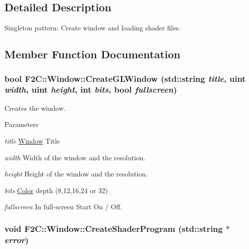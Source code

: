 \subsection{Detailed Description}
Singleton pattern: Create window and loading shader files. 

\subsection{Member Function Documentation}
\hypertarget{class_f2_c_1_1_window_aaf0f8a2b7bf33c732dc32ca862fc8dac}{
\subsubsection[{CreateGLWindow}]{\setlength{\rightskip}{0pt plus 5cm}bool F2C::Window::CreateGLWindow (std::string {\em title}, \/  {\bf uint} {\em width}, \/  {\bf uint} {\em height}, \/  int {\em bits}, \/  bool {\em fullscreen})}}
\label{class_f2_c_1_1_window_aaf0f8a2b7bf33c732dc32ca862fc8dac}


Creates the window. 
\begin{DoxyParams}{Parameters}
\item[{\em title}]\hyperlink{class_f2_c_1_1_window}{Window} Title \item[{\em width}]Width of the window and the resolution. \item[{\em height}]Height of the window and the resolution. \item[{\em bits}]\hyperlink{class_f2_c_1_1_color}{Color} depth (8,12,16,24 or 32) \item[{\em fullscreen}]In full-\/screen Start On / Off. \end{DoxyParams}
\hypertarget{class_f2_c_1_1_window_adad7a68be0de8516ae26ca4af18a2bdf}{
\subsubsection[{CreateShaderProgram}]{\setlength{\rightskip}{0pt plus 5cm}void F2C::Window::CreateShaderProgram (std::string $\ast$ {\em error})}}
\label{class_f2_c_1_1_window_adad7a68be0de8516ae26ca4af18a2bdf}


